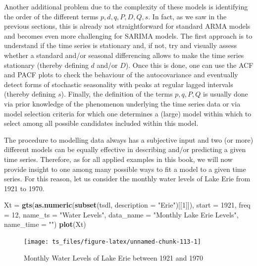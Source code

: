 \documentclass[]{book}
\newenvironment{Shaded}{\begin{snugshade}}{\end{snugshade}}
\newcommand{\KeywordTok}[1]{\textcolor[rgb]{0.13,0.29,0.53}{\textbf{#1}}}
\newcommand{\DataTypeTok}[1]{\textcolor[rgb]{0.13,0.29,0.53}{#1}}
\newcommand{\DecValTok}[1]{\textcolor[rgb]{0.00,0.00,0.81}{#1}}
\newcommand{\StringTok}[1]{\textcolor[rgb]{0.31,0.60,0.02}{#1}}
\newcommand{\NormalTok}[1]{#1}
\theoremstyle{definition}
\theoremstyle{definition}
\theoremstyle{definition}
\theoremstyle{remark}
\begin{document}
Another additional problem due to the complexity of these models is
identifying the order of the different terms \(p, d, q, P, D, Q, s\). In
fact, as we saw in the previous sections, this is already not
straightforward for standard ARMA models and becomes even more
challenging for SARIMA models. The first approach is to understand if
the time series is stationary and, if not, try and visually assess
whether a standard and/or seasonal differencing allows to make the time
series stationary (thereby defining \(d\) and/or \(D\)). Once this is
done, one can use the ACF and PACF plots to check the behaviour of the
autocovariance and eventually detect forms of stochastic seasonality
with peaks at regular lagged intervals (thereby defining \(s\)).
Finally, the definition of the terms \(p, q, P, Q\) is usually done via
prior knowledge of the phenomenon underlying the time series data or via
model selection criteria for which one determines a (large) model within
which to select among all possible candidates included within this
model.

The procedure to modelling data always has a subjective input and two
(or more) different models can be equally effective in describing and/or
predicting a given time series. Therefore, as for all applied examples
in this book, we will now provide insight to one among many possible
ways to fit a model to a given time series. For this reason, let us
consider the monthly water levels of Lake Erie from 1921 to 1970.

\begin{Shaded}
\begin{Highlighting}[]
\NormalTok{Xt =}\StringTok{ }\KeywordTok{gts}\NormalTok{(}\KeywordTok{as.numeric}\NormalTok{(}\KeywordTok{subset}\NormalTok{(tsdl, }\DataTypeTok{description =} \StringTok{"Erie"}\NormalTok{)[[}\DecValTok{1}\NormalTok{]]),}
    \DataTypeTok{start =} \DecValTok{1921}\NormalTok{, }\DataTypeTok{freq =} \DecValTok{12}\NormalTok{, }\DataTypeTok{name_ts =} \StringTok{"Water Levels"}\NormalTok{,}
    \DataTypeTok{data_name =} \StringTok{"Monthly Lake Erie Levels"}\NormalTok{, }\DataTypeTok{name_time =} \StringTok{""}\NormalTok{)}
\KeywordTok{plot}\NormalTok{(Xt)}
\end{Highlighting}
\end{Shaded}

\begin{figure}

{\centering \texttt{[image: ts\_files/figure-latex/unnamed-chunk-113-1]} 

}

\caption{Monthly Water Levels of Lake Erie between 1921 and 1970}\label{fig:unnamed-chunk-113}
\end{figure}
\end{document}
